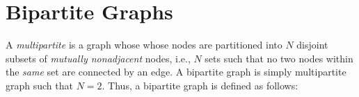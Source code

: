 \section{Bipartite Graphs}\label{sec:bipartite}
A \emph{multipartite} is a graph whose 
whose nodes are partitioned into $N$ disjoint subsets of 
\emph{mutually nonadjacent} nodes, i.e., $N$ sets such that no two
nodes within the \emph{same} set are connected by an edge. A bipartite graph
is simply multipartite graph such that $N = 2$. Thus, a bipartite graph is defined 
as follows:

